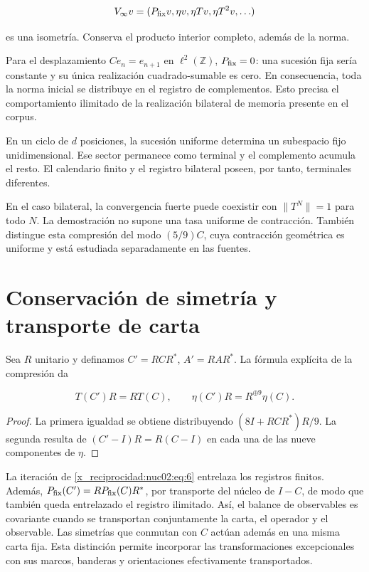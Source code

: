 \[
V_\infty v=(P_{\rm fix}v,\eta v,\eta Tv,\eta T^2v,\ldots)
\]

es una isometría. Conserva el producto interior completo, además de la norma.

\begin{corollary}
Para el desplazamiento \(Ce_n=e_{n+1}\) en \(\ell^2(\mathbb Z)\), \(P_{\rm fix}=0\): una sucesión fija sería constante y su única realización cuadrado-sumable es cero. En consecuencia, toda la norma inicial se distribuye en el registro de complementos. Esto precisa el comportamiento ilimitado de la realización bilateral de memoria presente en el corpus.
\end{corollary}

\begin{corollary}
En un ciclo de \(d\) posiciones, la sucesión uniforme determina un subespacio fijo unidimensional. Ese sector permanece como terminal y el complemento acumula el resto. El calendario finito y el registro bilateral poseen, por tanto, terminales diferentes.
\end{corollary}

En el caso bilateral, la convergencia fuerte puede coexistir con \(\|T^N\|=1\) para todo \(N\). La demostración no supone una tasa uniforme de contracción. También distingue esta compresión del modo \((5/9)C\), cuya contracción geométrica es uniforme y está estudiada separadamente en las fuentes.

\section{Conservación de simetría y transporte de carta}

Sea \(R\) unitario y definamos \(C'=RCR^*\), \(A'=RAR^*\). La fórmula explícita de la compresión da

\begin{equation}
T(C')R=RT(C),\qquad
\eta(C')R=R^{\oplus9}\eta(C).\label{x_reciprocidad:nuc02:eq:6}
\end{equation}

\begin{proof}
La primera igualdad se obtiene distribuyendo \((8I+RCR^*)R/9\). La segunda resulta de \((C'-I)R=R(C-I)\) en cada una de las nueve componentes de \(\eta\).
\end{proof}

La iteración de \eqref{x_reciprocidad:nuc02:eq:6} entrelaza los registros finitos. Además, \(P_{\rm fix}(C')=RP_{\rm fix}(C)R^*\), por transporte del núcleo de \(I-C\), de modo que también queda entrelazado el registro ilimitado. Así, el balance de observables es covariante cuando se transportan conjuntamente la carta, el operador y el observable. Las simetrías que conmutan con \(C\) actúan además en una misma carta fija. Esta distinción permite incorporar las transformaciones excepcionales con sus marcos, banderas y orientaciones efectivamente transportados.

